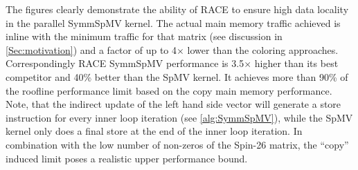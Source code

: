 The figures clearly demonstrate the ability of \acrshort{RACE} to ensure high data locality in the parallel \acrshort{SymmSpMV} kernel. The actual main memory traffic achieved is inline with the minimum traffic for that matrix (see discussion in \cref{Sec:motivation}) and a factor of up to 4$\times$ lower than the coloring approaches. Correspondingly \acrshort{RACE} \acrshort{SymmSpMV} performance is 3.5$\times$ higher than its best competitor and 40\% better than the \acrshort{SpMV} kernel. It achieves more than 90\% of the roofline performance limit based on the copy main memory performance. Note, that the indirect update of the left hand side vector will generate a store instruction for every inner loop iteration (see \cref{alg:SymmSpMV}), while the \acrshort{SpMV} kernel only does a final store at the end of the inner loop iteration. In combination with the low number of non-zeros of the Spin-26 matrix, the ``copy'' induced limit poses a realistic upper performance bound.  
%
